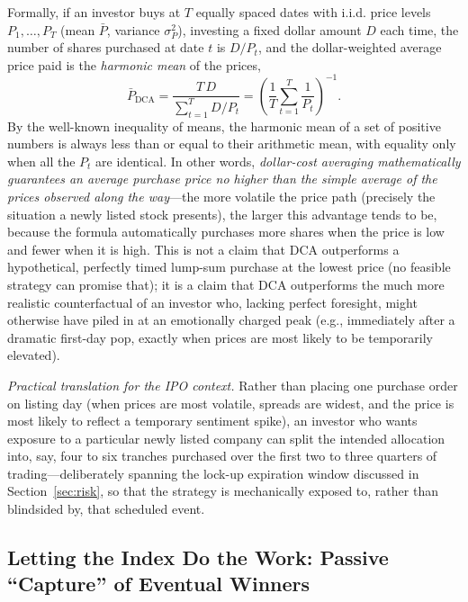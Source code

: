 \documentclass[conference]{IEEEtran}
\begin{document}
Formally, if an investor buys at $T$ equally spaced dates with i.i.d. price levels $P_1, \dots, P_T$ (mean $\bar{P}$, variance $\sigma_P^2$), investing a fixed dollar amount $D$ each time, the number of shares purchased at date $t$ is $D/P_t$, and the dollar-weighted average price paid is the \emph{harmonic mean} of the prices,
\begin{equation}
\bar{P}_{\text{DCA}} = \frac{T\,D}{\sum_{t=1}^{T} D/P_t} = \left( \frac{1}{T}\sum_{t=1}^{T} \frac{1}{P_t} \right)^{-1}.
\label{eq:dca}
\end{equation}
By the well-known inequality of means, the harmonic mean of a set of positive numbers is always less than or equal to their arithmetic mean, with equality only when all the $P_t$ are identical. In other words, \emph{dollar-cost averaging mathematically guarantees an average purchase price no higher than the simple average of the prices observed along the way}---the more volatile the price path (precisely the situation a newly listed stock presents), the larger this advantage tends to be, because the formula automatically purchases more shares when the price is low and fewer when it is high. This is not a claim that DCA outperforms a hypothetical, perfectly timed lump-sum purchase at the lowest price (no feasible strategy can promise that); it is a claim that DCA outperforms the much more realistic counterfactual of an investor who, lacking perfect foresight, might otherwise have piled in at an emotionally charged peak (e.g., immediately after a dramatic first-day pop, exactly when prices are most likely to be temporarily elevated).

\noindent\textit{Practical translation for the IPO context.} Rather than placing one purchase order on listing day (when prices are most volatile, spreads are widest, and the price is most likely to reflect a temporary sentiment spike), an investor who wants exposure to a particular newly listed company can split the intended allocation into, say, four to six tranches purchased over the first two to three quarters of trading---deliberately spanning the lock-up expiration window discussed in Section~\ref{sec:risk}, so that the strategy is mechanically exposed to, rather than blindsided by, that scheduled event.

\subsection{Letting the Index Do the Work: Passive ``Capture'' of Eventual Winners}
\end{document}
